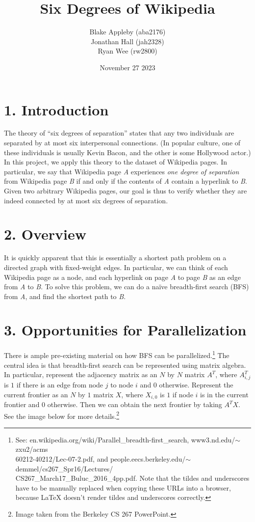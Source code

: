 \documentclass[12pt]{article}
\title{Six Degrees of Wikipedia}
\author{Blake Appleby (aba2176)\\Jonathan Hall (jah2328)\\Ryan Wee (rw2800)}
\date{November 27 2023}
\begin{document}
\maketitle

\section*{1. Introduction}

The theory of ``six degrees of separation'' states that any two individuals are separated by at most six interpersonal connections. (In popular culture, one of these individuals is usually Kevin Bacon, and the other is some Hollywood actor.) In this project, we apply this theory to the dataset of Wikipedia pages. In particular, we say that Wikipedia page \textit{A} experiences \textit{one degree of separation} from Wikipedia page \textit{B} if and only if the contents of \textit{A} contain a hyperlink to \textit{B}. Given two arbitrary Wikipedia pages, our goal is thus to verify whether they are indeed connected by at most six degrees of separation. 

\section*{2. Overview}

It is quickly apparent that this is essentially a shortest path problem on a directed graph with fixed-weight edges. In particular, we can think of each Wikipedia page as a node, and each hyperlink on page \textit{A} to page \textit{B} as an edge from \textit{A} to \textit{B}. To solve this problem, we can do a naïve breadth-first search (BFS) from \textit{A}, and find the shortest path to \textit{B}.

\section*{3. Opportunities for Parallelization}

There is ample pre-existing material on how BFS can be parallelized.\footnote{See: en.wikipedia.org/wiki/Parallel\_breadth-first\_search, www3.nd.edu/$\sim$zxu2/acms\\60212-40212/Lec-07-2.pdf, and people.eecs.berkeley.edu/$\sim$demmel/cs267\_Spr16/Lectures/\\CS267\_March17\_Buluc\_2016\_4pp.pdf. Note that the tildes and underscores have to be manually replaced when copying these URLs into a browser, because LaTeX doesn't render tildes and underscores correctly.} The central idea is that breadth-first search can be represented using matrix algebra. In particular, represent the adjacency matrix as an $N$ by $N$ matrix $A^T$, where $A^T_{i,j}$ is $1$ if there is an edge from node $j$ to node $i$ and $0$ otherwise. Represent the current frontier as an $N$ by $1$ matrix $X$, where $X_{i,0}$ is $1$ if node $i$ is in the current frontier and $0$ otherwise. Then we can obtain the next frontier by taking $A^TX$. See the image below for more details.\footnote{Image taken from the Berkeley CS 267 PowerPoint.}
\end{document}
